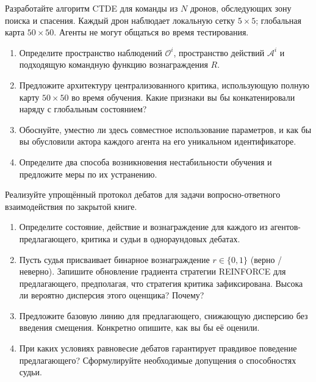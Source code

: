 \begin{exercise}
\label{ex:ctde-communication}
Разработайте алгоритм CTDE для команды из $N$ дронов, обследующих
зону поиска и спасения. Каждый дрон наблюдает локальную сетку $5 \times 5$; глобальная
карта $50 \times 50$. Агенты не могут общаться во время тестирования.
\begin{enumerate}[label=(\alph*)]
  \item Определите пространство наблюдений $\mathcal{O}^i$, пространство действий
    $\mathcal{A}^i$ и подходящую командную функцию вознаграждения $R$.
  \item Предложите архитектуру централизованного критика, использующую
    полную карту $50 \times 50$ во время обучения. Какие признаки вы бы
    конкатенировали наряду с глобальным состоянием?
  \item Обоснуйте, уместно ли здесь совместное использование параметров, и
    как бы вы обусловили актора каждого агента на его уникальном
    идентификаторе.
  \item Определите два способа возникновения нестабильности обучения и
    предложите меры по их устранению.
\end{enumerate}
\end{exercise}

\begin{exercise}
\label{ex:debate-reward}
Реализуйте упрощённый протокол дебатов для задачи вопросно-ответного взаимодействия
по закрытой книге.
\begin{enumerate}[label=(\alph*)]
  \item Определите состояние, действие и вознаграждение для каждого из
    агентов-предлагающего, критика и судьи в однораундовых дебатах.
  \item Пусть судья присваивает бинарное вознаграждение $r \in \{0, 1\}$
    (верно / неверно). Запишите обновление градиента стратегии REINFORCE
    для предлагающего, предполагая, что стратегия критика
    зафиксирована. Высока ли вероятно дисперсия этого оценщика?
    Почему?
  \item Предложите базовую линию для предлагающего, снижающую дисперсию
    без введения смещения. Конкретно опишите, как вы бы её оценили.
  \item При каких условиях равновесие дебатов гарантирует
    правдивое поведение предлагающего? Сформулируйте необходимые
    допущения о способностях судьи.
\end{enumerate}
\end{exercise}

